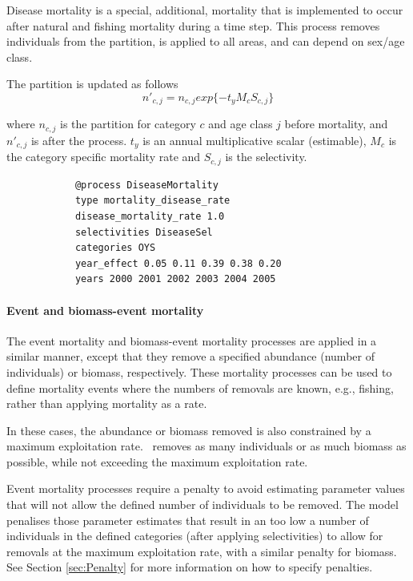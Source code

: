Disease mortality is a special, additional, mortality that is implemented to occur after natural and fishing mortality during a time step. This process removes individuals from the partition, is applied to all areas, and can depend on sex/age class.

The partition is updated as follows
\begin{equation}
	n'_{c,j} = n_{c,j}  exp\{-t_y M_{c} S_{c,j} \}
\end{equation}

where \(n_{c,j}\) is the partition for category \(c\) and age class \(j\) before mortality, and \(n'_{c,j}\)  is after the process. \(t_y\) is an annual multiplicative scalar (estimable), \(M_{c}\) is the category specific mortality rate and \(S_{c,j}\) is the selectivity.

{\small{\begin{verbatim}
			@process DiseaseMortality
			type mortality_disease_rate
			disease_mortality_rate 1.0
			selectivities DiseaseSel 
			categories OYS
			year_effect 0.05 0.11 0.39 0.38 0.20 
			years 2000 2001 2002 2003 2004 2005 
\end{verbatim}}}

\paragraph{Event and biomass-event mortality}\label{sec:Process-MortalityEvent}\label{sec:Process-MortalityEventBiomass} 


The event mortality and biomass-event mortality processes are applied in a similar manner, except that they remove a specified abundance (number of individuals) or biomass, respectively. These mortality processes can be used to define mortality events where the numbers of removals are known, e.g., fishing, rather than applying mortality as a rate.

In these cases, the abundance or biomass removed is also constrained by a maximum exploitation rate. \CNAME\ removes as many individuals or as much biomass as possible,  while not exceeding the maximum exploitation rate.

Event mortality processes require a penalty to avoid estimating parameter values that will not allow the defined number of individuals to be removed. The model penalises those parameter estimates that result in an too low a number of individuals in the defined categories (after applying selectivities) to allow for removals at the maximum exploitation rate, with a similar penalty for biomass. See Section \ref{sec:Penalty} for more information on how to specify penalties.

